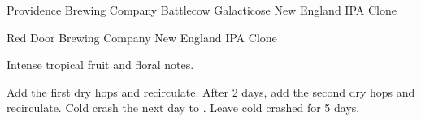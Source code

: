 \begin{recipe}{Providence Brewing Company Battlecow Galacticose New England IPA Clone}
\begin{ingredientsblock}

\end{ingredientsblock}

\end{recipe}

\begin{recipe}{Red Door Brewing Company New England IPA Clone}

\begin{aboutblock}
Intense tropical fruit and floral notes. \sourceaha
\end{aboutblock}


\begin{methodandtiming}
 
\begin{mashsteps}
\end{mashsteps}

\begin{fermentationsteps}
\end{fermentationsteps}

\begin{directions}
Add the first dry hops and recirculate. After 2 days, add the second dry hops
and recirculate. Cold crash the next day to . Leave cold crashed
for 5 days.
\end{directions}

\end{methodandtiming}

\recipebreak

\begin{ingredientsblock}

\begin{malts}
\end{malts}

\begin{hops}
\end{hops}


\end{ingredientsblock}
\end{recipe}
